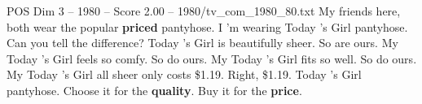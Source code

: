 \begin{textsample}{POS Dim 3 – 1980 – Score 2.00 – 1980/tv\_com\_1980\_80.txt}  \label{ex:f3_pos_053}
My friends here, both wear the popular \textbf{priced} pantyhose.
I 'm wearing Today 's Girl pantyhose.
Can you tell the difference?
Today 's Girl is beautifully sheer.
So are ours.
My Today 's Girl feels so comfy.
So do ours.
My Today 's Girl fits so well.
So do ours.
My Today 's Girl all sheer only costs \$1.19.
Right, \$1.19.
Today 's Girl pantyhose.
Choose it for the \textbf{quality}.
Buy it for the \textbf{price}.

\end{textsample}
